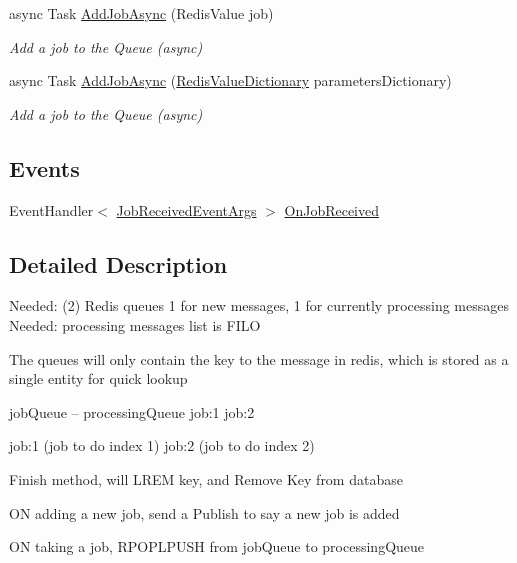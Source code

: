 \begin{DoxyCompactItemize}
async Task \hyperlink{class_demgel_redis_1_1_job_queue_1_1_redis_job_queue_aa1d6b8bfafb4ae2210c7ca3134307a52}{Add\+Job\+Async} (Redis\+Value job)
\begin{DoxyCompactList}\small\item\em Add a job to the Queue (async) \end{DoxyCompactList}\item 
async Task \hyperlink{class_demgel_redis_1_1_job_queue_1_1_redis_job_queue_af5bc5168b1811ba89f31ce82ae9b0c4c}{Add\+Job\+Async} (\hyperlink{class_demgel_redis_1_1_job_queue_1_1_redis_value_dictionary}{Redis\+Value\+Dictionary} parameters\+Dictionary)
\begin{DoxyCompactList}\small\item\em Add a job to the Queue (async) \end{DoxyCompactList}\end{DoxyCompactItemize}
\subsection*{Events}
\begin{DoxyCompactItemize}
\item 
Event\+Handler$<$ \hyperlink{class_demgel_redis_1_1_events_1_1_job_received_event_args}{Job\+Received\+Event\+Args} $>$ \hyperlink{class_demgel_redis_1_1_job_queue_1_1_redis_job_queue_a98fc5a40355d1ffe3ecb61b221d8d254}{On\+Job\+Received}
\end{DoxyCompactItemize}


\subsection{Detailed Description}
Needed\+: (2) Redis queues 1 for new messages, 1 for currently processing messages Needed\+: processing messages list is F\+I\+L\+O 

The queues will only contain the key to the message in redis, which is stored as a single entity for quick lookup

job\+Queue -- processing\+Queue job\+:1 job\+:2

job\+:1 (job to do index 1) job\+:2 (job to do index 2)

Finish method, will L\+R\+E\+M key, and Remove Key from database

O\+N adding a new job, send a Publish to say a new job is added

O\+N taking a job, R\+P\+O\+P\+L\+P\+U\+S\+H from job\+Queue to processing\+Queue


